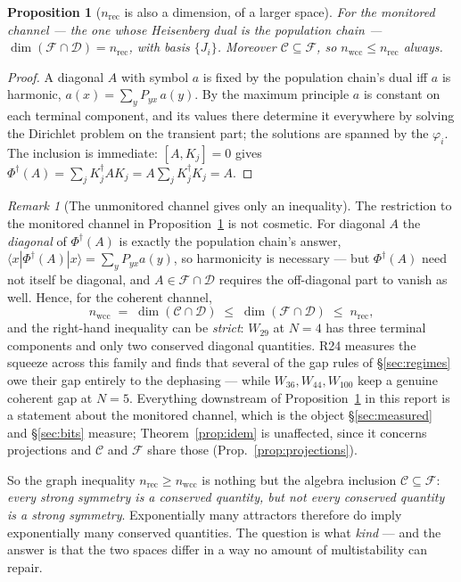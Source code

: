 \documentclass[11pt]{article}
\newcommand{\Phid}{\Phi^{\dagger}}
\theoremstyle{plain}
\newtheorem{proposition}{Proposition}
\theoremstyle{definition}
\theoremstyle{remark}
\newtheorem{remark}{Remark}
\begin{document}
\begin{proposition}[$n_{\mathrm{rec}}$ is also a dimension, of a larger space]
\label{prop:fdim}
For the \emph{monitored} channel --- the one whose Heisenberg dual is the
population chain --- $\dim(\mathcal{F} \cap \mathcal{D}) = n_{\mathrm{rec}}$,
with basis $\{J_i\}$. Moreover $\mathcal{C} \subseteq \mathcal{F}$, so
$n_{\mathrm{wcc}} \le n_{\mathrm{rec}}$ always.
\end{proposition}

\begin{proof}
A diagonal $A$ with symbol $a$ is fixed by the population chain's dual iff $a$
is harmonic, $a(x) = \sum_y P_{yx}\,a(y)$. By the maximum principle $a$ is
constant on each terminal component, and its values there determine it
everywhere by solving the Dirichlet problem on the transient part; the solutions
are spanned by the $\varphi_i$. The inclusion is immediate: $[A,K_j]=0$ gives
$\Phid(A) = \sum_j K_j^\dagger A K_j = A\sum_j K_j^\dagger K_j = A$.
\end{proof}

\begin{remark}[The unmonitored channel gives only an inequality]
\label{rem:squeeze}
The restriction to the monitored channel in Proposition~\ref{prop:fdim} is not
cosmetic. For diagonal $A$ the \emph{diagonal} of $\Phid(A)$ is exactly the
population chain's answer, $\langle x|\Phid(A)|x\rangle = \sum_y P_{yx} a(y)$,
so harmonicity is necessary --- but $\Phid(A)$ need not itself be diagonal, and
$A \in \mathcal{F}\cap\mathcal{D}$ requires the off-diagonal part to vanish as
well. Hence, for the coherent channel,
\[
  n_{\mathrm{wcc}} \;=\; \dim(\mathcal{C}\cap\mathcal{D})
  \;\le\; \dim(\mathcal{F}\cap\mathcal{D}) \;\le\; n_{\mathrm{rec}},
\]
and the right-hand inequality can be \emph{strict}: $W_{29}$ at $N=4$ has three
terminal components and only two conserved diagonal quantities. R24 measures
the squeeze across this family and finds that several of the gap rules of
\S\ref{sec:regimes} owe their gap entirely to the dephasing --- while
$W_{36}, W_{44}, W_{100}$ keep a genuine coherent gap at $N=5$. Everything
downstream of Proposition~\ref{prop:fdim} in this report is a statement about
the monitored channel, which is the object \S\ref{sec:measured} and
\S\ref{sec:bits} measure; Theorem~\ref{prop:idem} is unaffected, since it
concerns projections and $\mathcal{C}$ and $\mathcal{F}$ share those
(Prop.~\ref{prop:projections}).
\end{remark}

So the graph inequality $n_{\mathrm{rec}} \ge n_{\mathrm{wcc}}$ is nothing but
the algebra inclusion $\mathcal{C} \subseteq \mathcal{F}$: \emph{every strong
symmetry is a conserved quantity, but not every conserved quantity is a strong
symmetry}. Exponentially many attractors therefore do imply exponentially many
conserved quantities. The question is what \emph{kind} --- and the answer is
that the two spaces differ in a way no amount of multistability can repair.
\end{document}
